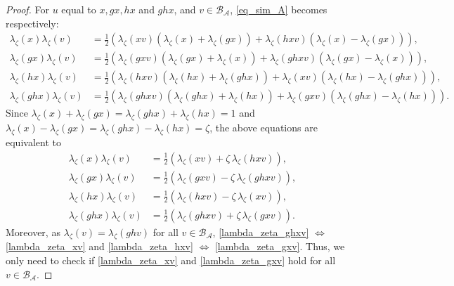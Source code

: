 \documentclass[reqno]{amsart}
\theoremstyle{definition}
\numberwithin{equation}{section}\theoremstyle{plain}
\newcommand{\B}{\mathcal{B}}
\theoremstyle{definition}
\def \A {\mathcal{A}}
\begin{document}
\begin{proof}
For $u$ equal to $x, gx, hx$ and $ghx$, and $v \in \B_\A$, \eqref{eq_sim_A} becomes respectively:
\begin{align*}
\lambda_\zeta(x)\lambda_\zeta(v) & = \tfrac{1}{2} \left( \lambda_\zeta(x v) \left( \lambda_\zeta(x) + \lambda_\zeta(gx) \right) + \lambda_\zeta(hx v) \left( \lambda_\zeta(x) - \lambda_\zeta(gx) \right) \right),\\
\lambda_\zeta(gx)\lambda_\zeta(v) & = \tfrac{1}{2} \left( \lambda_\zeta(gx v) \left( \lambda_\zeta(gx) + \lambda_\zeta(x) \right) + \lambda_\zeta(ghx v) \left( \lambda_\zeta(gx) - \lambda_\zeta(x) \right) \right),\\
\lambda_\zeta(hx)\lambda_\zeta(v) & = \tfrac{1}{2} \left( \lambda_\zeta(hx v) \left( \lambda_\zeta(hx) + \lambda_\zeta(ghx) \right) + \lambda_\zeta(x v) \left( \lambda_\zeta(hx) - \lambda_\zeta(ghx) \right) \right),\\
\lambda_\zeta(ghx)\lambda_\zeta(v) & = \tfrac{1}{2} \left( \lambda_\zeta(ghx v) \left( \lambda_\zeta(ghx) + \lambda_\zeta(hx) \right) + \lambda_\zeta(gx v) \left( \lambda_\zeta(ghx) - \lambda_\zeta(hx) \right) \right).
\end{align*}
Since $\lambda_\zeta(x)+\lambda_\zeta(gx) =\lambda_\zeta(ghx)+\lambda_\zeta(hx) =1$ and $\lambda_\zeta(x)-\lambda_\zeta(gx) = \lambda_\zeta(ghx)-\lambda_\zeta(hx) =\zeta$, the above equations are equivalent to
\begin{align}
\lambda_\zeta(x)\lambda_\zeta(v) & = \tfrac{1}{2} \left( \lambda_\zeta(x v) + \zeta \, \lambda_\zeta(hx v)  \right), \label{lambda_zeta_xv}\\
\lambda_\zeta(gx)\lambda_\zeta(v) & = \tfrac{1}{2} \left( \lambda_\zeta(gx v) - \zeta \, \lambda_\zeta(ghx v) \right), \label{lambda_zeta_gxv}\\
\lambda_\zeta(hx)\lambda_\zeta(v) & = \tfrac{1}{2} \left( \lambda_\zeta(hx v) - \zeta \, \lambda_\zeta(x v) \right), \label{lambda_zeta_hxv}\\
\lambda_\zeta(ghx)\lambda_\zeta(v) & = \tfrac{1}{2} \left( \lambda_\zeta(ghx v) + \zeta \, \lambda_\zeta(gx v)  \right).\label{lambda_zeta_ghxv}
\end{align}
Moreover, as $\lambda_\zeta(v)=\lambda_\zeta(ghv)$ for all $v \in \B_\A$, 
\eqref{lambda_zeta_ghxv} $\Leftrightarrow$ \eqref{lambda_zeta_xv} and \eqref{lambda_zeta_hxv} $\Leftrightarrow$ \eqref{lambda_zeta_gxv}.
Thus, we only need to check if
\eqref{lambda_zeta_xv} and \eqref{lambda_zeta_gxv}
hold for all $v \in \B_\A$.


\end{proof}
\end{document}
